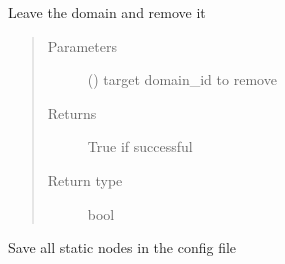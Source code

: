 \documentclass[letterpaper,10pt,english]{sphinxmanual}
\begin{document}
\begin{fulllineitems}
\begin{fulllineitems}
\label{\detokenize{bbc1.core.bbc_network:bbc1.core.bbc_network.BBcNetwork.remove_domain}}
Leave the domain and remove it
\begin{quote}\begin{description}
\item[{Parameters}] \leavevmode
{} () \textendash{} target domain\_id to remove

\item[{Returns}] \leavevmode
True if successful

\item[{Return type}] \leavevmode
bool

\end{description}\end{quote}

\end{fulllineitems}


\begin{fulllineitems}
\label{\detokenize{bbc1.core.bbc_network:bbc1.core.bbc_network.BBcNetwork.save_all_static_node_list}}
Save all static nodes in the config file

\end{fulllineitems}



\end{fulllineitems}
\end{document}
